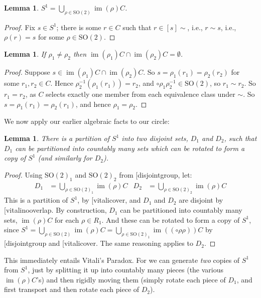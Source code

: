 \documentclass[10pt,a4paper]{article}
\makeatletter
\theoremstyle{plain}
\newtheorem{lem}[thm]{Lemma}
\theoremstyle{definition}
\theoremstyle{remark}
\newcommand*{\ollabel}[1]{\label{#1}}
\newcommand{\olref}{\@ifnextchar[{\olref@i}{\olref@final}}
\def\olref@i[#1]{\@ifnextchar[{\olref@ii}{\olref@final}}
\def\olref@ii[#1]{\@ifnextchar[{\olref@iii}{\olref@final}}
\def\olref@iii[#1]{\olref@final}
\def\olref@final#1{\ref{#1}}
\providecommand{\funimage}[1]{\operatorname{im}(#1)}
\providecommand{\onesphere}{S^1}
\providecommand{\rotationsgroup}{\mathrm{SO}(2)}
\providecommand{\equivrep}[1]{[#1]}
\providecommand{\comp}{\circ}
\makeatother
\begin{document}
\begin{lem}\ollabel{vitalicover}
$\onesphere = \bigcup_{\rho \in \rotationsgroup} \funimage{\rho}{C}$.
\end{lem}

\begin{proof}
Fix $s \in \onesphere$; there is some $r \in C$ such that $r \in
\equivrep{s}{\sim}$, i.e., $r \sim s$, i.e., $\rho(r) = s$ for some
$\rho \in \rotationsgroup$. 
\end{proof}

\begin{lem}\ollabel{vitalinooverlap}
If $\rho_1 \neq \rho_2$ then $\funimage{\rho_1}{C} \cap \funimage{\rho_2}{C} = \emptyset$. 
\end{lem}

\begin{proof}
Suppose $s \in \funimage{\rho_{1}}{C} \cap \funimage{\rho_{2}}{C}$. So
$s = \rho_{1}(r_{1}) = \rho_{2}(r_{2})$ for some $r_{1}, r_{2} \in C$.
Hence $\rho^{-1}_2(\rho_1(r_1)) = r_2$, and
$\comp{\rho_1}{\rho^{-1}_2} \in \rotationsgroup$, so $r_{1} \sim
r_{2}$. So $r_1 = r_2$, as $C$ selects exactly one member from each
equivalence class under $\sim$. So $s = \rho_1(r_1) = \rho_2(r_1)$,
and hence $\rho_1 = \rho_2$.
\end{proof}

We now apply our earlier algebraic facts to our circle:

\begin{lem}\ollabel{pseudobanachtarski}
There is a partition of $\onesphere$ into two disjoint sets, $D_{1}$
and $D_{2}$, such that $D_{1}$ can be partitioned into countably many
sets which can be rotated to form a copy of $\onesphere$ (and
similarly for $D_{2}$).
\end{lem}

\begin{proof}
Using $\rotationsgroup_{1}$ and $\rotationsgroup_{2}$ from \olref{disjointgroup}, let:
\begin{align*}
	D_{1} &= \bigcup_{\rho \in \rotationsgroup_1} \funimage{\rho}{C} & 
	D_{2} &= \bigcup_{\rho \in \rotationsgroup_2} \funimage{\rho}{C}
\end{align*}
This is a partition of $\onesphere$, by \olref{vitalicover}, and $D_1$
and $D_2$ are disjoint by \olref{vitalinooverlap}. By construction,
$D_1$ can be partitioned into countably many sets,
$\funimage{\rho}{C}$ for each $\rho \in R_1$. And these can be rotated
to form a copy of $\onesphere$, since $\onesphere = \bigcup_{\rho \in
\rotationsgroup}\funimage{\rho}{C} = \bigcup_{\rho \in
\rotationsgroup_1}\funimage{(\comp{\rho}{\rho})}{C}$ by
\olref{disjointgroup} and \olref{vitalicover}. The same reasoning
applies to $D_2$. \end{proof}\noindent This immediately entails
Vitali's Paradox. For we can generate \emph{two} copies of
$\onesphere$ from $\onesphere$, just by splitting it up into countably
many pieces (the various $\funimage{\rho}{C}$'s) and then rigidly
moving them (simply rotate each piece of $D_1$, and first transport
and then rotate each piece of $D_2$).
\end{document}
